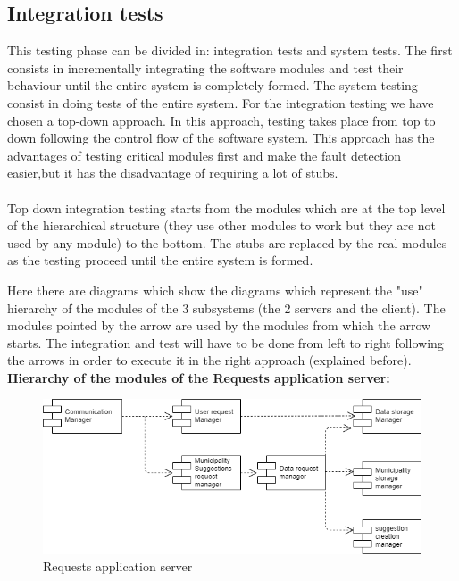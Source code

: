 \documentclass[titlepage]{article}
\begin{document}
\subsection{Integration tests}
This testing phase can be divided in: integration tests and system tests. The first consists in incrementally integrating the software modules and test their behaviour until the entire system is completely formed. The system testing consist in doing tests of the entire system. For the integration testing we have chosen a top-down approach. In this approach, testing takes place from top to down following the control flow of the software system. This approach has the advantages of testing critical modules first and make the fault detection easier,but it has the disadvantage of requiring a lot of  stubs. \\ \\
Top down integration testing starts from the modules which are at the top level of the hierarchical structure (they use other modules to work but they are not used by any module) to the bottom. The stubs are replaced by the real modules as the testing proceed until the entire system is formed.

Here there are diagrams which show the diagrams which represent the "use" hierarchy of the modules of the 3 subsystems (the 2 servers and the client). The modules pointed by the arrow are used by the modules from which the arrow starts. The integration and test will have to be done from left to right following the arrows in order to execute it in the right approach (explained before).\\

\textbf{Hierarchy of the modules of the Requests application server:}

\begin{figure}[h]
\includegraphics[scale=0.5]{Diagrams/Request application servers.png}
	\caption{Requests application server}
\end{figure}
\FloatBarrier
\end{document}
